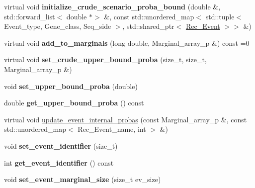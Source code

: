 \begin{DoxyCompactItemize}
\item 
\mbox{\label{classRec__Event_ad1df9fff876350910e4085f67ba33ea2}} 
virtual void {\bfseries initialize\+\_\+crude\+\_\+scenario\+\_\+proba\+\_\+bound} (double \&, std\+::forward\+\_\+list$<$ double $\ast$$>$ \&, const std\+::unordered\+\_\+map$<$ std\+::tuple$<$ Event\+\_\+type, Gene\+\_\+class, Seq\+\_\+side $>$, std\+::shared\+\_\+ptr$<$ \hyperlink{classRec__Event}{Rec\+\_\+\+Event} $>$$>$ \&)
\item 
\mbox{\label{classRec__Event_a16ba99854c015c6ae915814edba74b89}} 
virtual void {\bfseries add\+\_\+to\+\_\+marginals} (long double, Marginal\+\_\+array\+\_\+p \&) const =0
\item 
\mbox{\label{classRec__Event_ac279e3c17ccd88ad7c64d2962da762fe}} 
virtual void {\bfseries set\+\_\+crude\+\_\+upper\+\_\+bound\+\_\+proba} (size\+\_\+t, size\+\_\+t, Marginal\+\_\+array\+\_\+p \&)
\item 
\mbox{\label{classRec__Event_a0e31d0c1ee79f16b3e6232fa854730db}} 
void {\bfseries set\+\_\+upper\+\_\+bound\+\_\+proba} (double)
\item 
\mbox{\label{classRec__Event_a52c29bfae989da81330569b45c6f5d81}} 
double {\bfseries get\+\_\+upper\+\_\+bound\+\_\+proba} () const
\item 
virtual void \hyperlink{classRec__Event_a6b5b41f5d35969c61ba5fc90895203c3}{update\+\_\+event\+\_\+internal\+\_\+probas} (const Marginal\+\_\+array\+\_\+p \&, const std\+::unordered\+\_\+map$<$ Rec\+\_\+\+Event\+\_\+name, int $>$ \&)
\item 
\mbox{\label{classRec__Event_a47dab56164c703538f2ce214e88a80f6}} 
void {\bfseries set\+\_\+event\+\_\+identifier} (size\+\_\+t)
\item 
\mbox{\label{classRec__Event_af6798049fbccee092bdd076b0db2c0a8}} 
int {\bfseries get\+\_\+event\+\_\+identifier} () const
\item 
\mbox{\label{classRec__Event_aa5239e0c8d49b37c3e11e6d9554f47af}} 
void {\bfseries set\+\_\+event\+\_\+marginal\+\_\+size} (size\+\_\+t ev\+\_\+size)
\item 

\end{DoxyCompactItemize}
